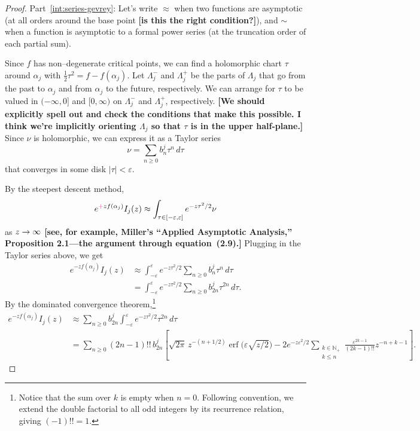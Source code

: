 \documentclass{article}
\let\Re\relax
\DeclareMathOperator{\Re}{Re}
\theoremstyle{definition}
\begin{document}
\begin{proof}

Part~\eqref{int:series-gevrey}: Let's write $\approx$ when two functions are asymptotic (at all orders around the base point \textbf{[is this the right condition?]}), and $\sim$ when a function is asymptotic to a formal power series (at the truncation order of each partial sum).

Since $f$ has non--degenerate critical points, we can find a holomorphic chart $\tau$ around $\alpha_j$ with $\tfrac{1}{2} \tau^2 = f - f(\alpha_j)$. Let $\Lambda^-_j$ and $\Lambda^+_j$ be the parts of $\Lambda_j$ that go from the past to $\alpha_j$ and from $\alpha_j$ to the future, respectively. We can arrange for $\tau$ to be valued in $(-\infty, 0]$ and $[0, \infty)$ on $\Lambda^-_j$ and $\Lambda^+_j$, respectively. \textbf{[We should explicitly spell out and check the conditions that make this possible. I think we're implicitly orienting $\Lambda_j$ so that $\tau$ is in the upper half-plane.]} Since $\nu$ is holomorphic, we can express it as a Taylor series
\[ \nu = \sum_{n \ge 0} b_n^j \tau^n\,d\tau \]
that converges in some disk $|\tau| < \varepsilon$.

By the steepest descent method,
\[ e^{\textcolor{magenta}{+}z f(\alpha_j)} I_j(z) \approx \int_{\tau \in [-\varepsilon, \varepsilon]} e^{-z\tau^2/2} \nu \]
as $\Re z \to \infty$ \textbf{[see, for example, Miller's ``Applied Asymptotic Analysis,'' Proposition 2.1---the argument through equation~(2.9).]} Plugging in the Taylor series above, we get
\begin{align*}
e^{-z f(\alpha_j)} I_j(z) & \approx \int_{-\varepsilon}^\varepsilon e^{-z\tau^2/2} \sum_{n \ge 0} b_n^j \tau^n\,d\tau \\
& = \int_{-\varepsilon}^\varepsilon e^{-z\tau^2/2} \sum_{n \ge 0} b_{2n}^j \tau^{2n}\,d\tau.
\end{align*}
By the dominated convergence theorem,\footnote{Notice that the sum over $k$ is empty when $n = 0$. Following convention, we extend the double factorial to all odd integers by its recurrence relation, giving $(-1)!! = 1$.}
\begin{align*}
e^{-z f(\alpha_j)} I_j(z) & \approx \sum_{n \ge 0} b_{2n}^j \int_{-\varepsilon}^\varepsilon e^{-z\tau^2/2} \tau^{2n}\,d\tau \\
& = \sum_{n \ge 0} (2n-1)!!\,b_{2n}^j \left[ \sqrt{2\pi}\,z^{-(n+1/2)} \operatorname{erf}\big(\varepsilon \sqrt{z/2}\big) - 2e^{-z\varepsilon^2/2} \sum_{\substack{k \in \mathbb{N}_+ \\ k \le n}} \frac{\varepsilon^{2k-1}}{(2k-1)!!} z^{-n+k-1} \right].
\end{align*}


\end{proof}
\end{document}
